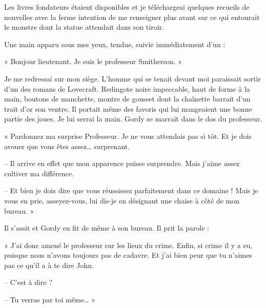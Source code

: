 Les livres fondateurs étaient disponibles et je téléchargeai quelques recueils de nouvelles avec la ferme intention de
me renseigner plus avant sur ce qui entourait le monstre dont la statue attendait dans son tiroir.

Une main apparu sous mes yeux, tendue, suivie immédiatement d'un :

« Bonjour lieutenant. Je suis le professeur Smitherson. »

Je me redressai sur mon siège. L'homme qui se tenait devant moi paraissait sortir d'un des romans de Lovecraft.
Redingote noire impeccable, haut de forme à la main, boutons de manchette, montre de gousset dont la chaînette barrait
d'un trait d'or son ventre. Il portait même des favoris qui lui mangeaient une bonne partie des joues. Je lui serrai 
la main. Gordy se marrait dans le dos du professeur.

« Pardonnez ma surprise Professeur. Je ne vous attendais pas si tôt. Et je dois avouer que vous êtes assez\ldots{}
surprenant. 

-- Il arrive en effet que mon apparence puisse surprendre. Mais j'aime assez cultiver ma différence.

-- Et bien je dois dire que vous réussissez parfaitement dans ce domaine ! Mais je vous en prie, asseyez-vous, lui
dis-je en désignant une chaise à côté de mon bureau. »

Il s'assit et Gordy en fit de même à son bureau. Il prit la parole :

« J'ai donc amené le professeur sur les lieux du crime. Enfin, si crime il y a eu, puisque nous n'avons toujours pas de
cadavre. Et j'ai bien peur que tu n'aimes pas ce qu'il a à te dire John.

-- C'est à dire ?

-- Tu verras par toi même\ldots{} »
